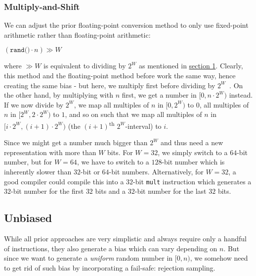 \documentclass[a4paper, UKenglish, cleveref, autoref, thm-restate]{lipics-v2021}
\begin{document}
\subsubsection{Multiply-and-Shift}\label{sec:2.1.3}
We can adjust the prior floating-point conversion method to only use fixed-point arithmetic rather than floating-point arithmetic:
\begin{center}
    $\left(\texttt{rand()} \cdot n\right) \gg W$
\end{center}
where $\gg W$ is equivalent to dividing by $2^W$ as mentioned in \hyperref[sec:1.2]{section 1}.
Clearly, this method and the floating-point method before work the same way, hence creating the same bias - but here, we multiply first before dividing by $2^W$~\cite{MultShift}.
On the other hand, by multiplying with $n$ first, we get a number in $[0,n \cdot 2^W)$ instead.
If we now divide by $2^W$, we map all multiples of $n$ in $[0,2^W)$ to $0$, all multiples of $n$ in $[2^W, 2 \cdot 2^W)$ to $1$, and so on such that we map all multiples of $n$ in $[i \cdot 2^W, (i + 1) \cdot 2^W)$ (the $(i + 1)$\textsuperscript{th} $2^W$-interval) to $i$.

Since we might get a number much bigger than $2^W$ and thus need a new representation with more than $W$ bits.
For $W = 32$, we simply switch to a $64$-bit number, but for $W = 64$, we have to switch to a $128$-bit number which is inherently slower than $32$-bit or $64$-bit numbers.
Alternatively, for $W = 32$, a good compiler could compile this into a $32$-bit \texttt{mult} instruction which generates a $32$-bit number for the first $32$ bits and a $32$-bit number for the last $32$ bits.


\subsection{Unbiased}
While all prior approaches are very simplistic and always require only a handful of instructions, they also generate a bias which can vary depending on $n$.
But since we want to generate a \emph{uniform} random number in $[0,n)$, we somehow need to get rid of such bias by incorporating a fail-safe: rejection sampling.
\end{document}
